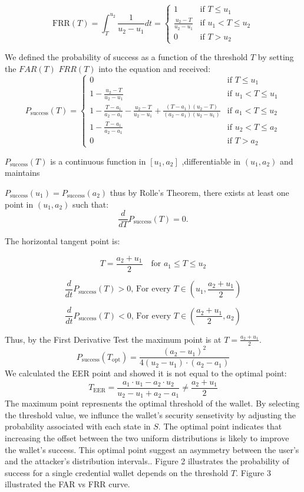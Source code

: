 \documentclass{article}
\begin{document}
\[
\text{FRR}(T) = \int_{T}^{u_2} \frac{1}{u_2-u_1} dt =
\left\{
\begin{array}{ll}
1 & \text{if } T \le u_1 \\
\frac{u_2-T}{u_2 - u_1} & \text{if } u_1 < T \le u_2 \\
0 & \text{if } T > u_2
\end{array}
\right.
\]

We defined the probability of success as a function of the threshold $T$ by setting the $FAR(T)$ $FRR(T)$ into the equation and received:
\[
P_{\text{success}}(T) = 
\left\{
\begin{array}{ll}
    0 & \text{if } T \le u_1 \\
    1 - \frac{u_2-T}{u_2-u_1} & \text{if } u_1 < T \le u_1 \\
    1 - \frac{T-a_1}{a_2-a_1} - \frac{u_2-T}{u_2-u_1} + \frac{(T-a_1)(u_2-T)}{(a_2-a_1)(u_2-u_1)} & \text{if } a_1 < T \le u_2 \\
    1 - \frac{T-a_1}{a_2-a_1} & \text{if } u_2 < T \le a_2 \\
    0 & \text{if } T > a_2
    \end{array}
\right.
\]

$P_{\text{success}}(T)$ is a continuous function in $[u_1,a_2]$ ,differentiable in $(u_1,a_2)$ and maintains 

$P_{\text{success}}(u_1) = P_{\text{success}}(a_2)$ thus by Rolle's Theorem, there exists at least one point in $(u_1,a_2)$ such that:
\[\frac{d}{dT} P_{\text{success}}(T) = 0.\] 

The horizontal tangent point is:

\[
T = \frac{a_2+u_1}{2} \quad \text{for } a_1 \leq T \leq u_2
\]

\[\frac{d}{dt} P_{\text{success}}(T) > 0 \text{, For every } T \in (u_1, \frac{a_2+u_1}{2}) \]

\[\frac{d}{dt} P_{\text{success}}(T) < 0 \text{, For every } T \in (\frac{a_2+u_1}{2}, a_2) \]

Thus, by the First Derivative Test the maximum point is at $T = \frac{a_2+u_1}{2}$.
\[
P_{\text{success}}(T_{\text{opt}}) = \frac{(a_2 - u_1)^2}{4(u_2 - u_1) \cdot(a_2 - a_1)} 
\]
We calculated the EER point and showed it is not equal to the optimal point:
\[
T_{\text{EER}} = \frac{a_1 \cdot u_1 - a_2 \cdot u_2}{u_2 - u_1 + a_2 - a_1} \neq \frac{a_2 + u_1}{2}
\] 
The maximum point represnents the optimal threshold of the wallet. By selecting the threshold value, we influnce the wallet's security sensetivity by adjusting the probability associated with each state in $S$. The optimal point indicates that increasing the offset between the two uniform distributions is likely to improve the wallet's success. This optimal point suggest an asymmetry between the user’s and the attacker’s distribution intervals.. Figure 2 illustrates the probability of success for a single credential wallet depends on the threshold $T$. Figure 3 illustrated the FAR vs FRR curve.
\end{document}
